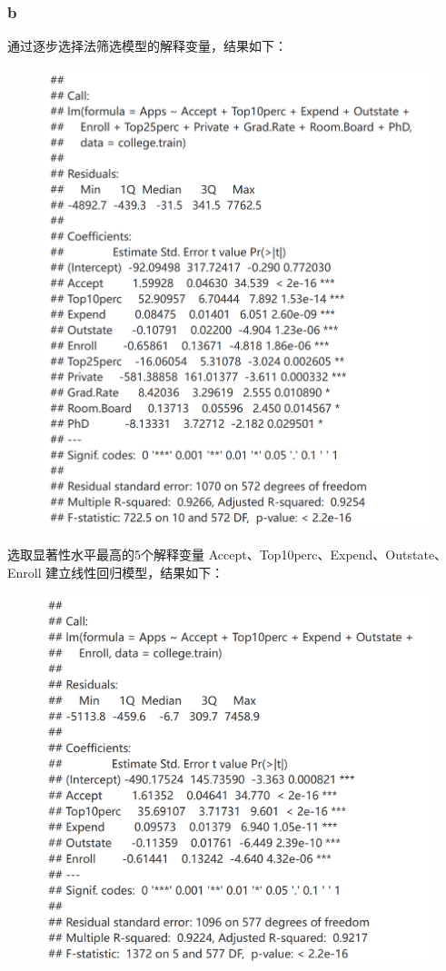 \documentclass[12pt,a4paper]{article}
\begin{document}
    \subsubsection*{b}
    通过逐步选择法筛选模型的解释变量，结果如下：
    \begin{figure}[H]
        \centering
        \includegraphics[scale=0.25]{Stepwise.png}
    \end{figure}
    选取显著性水平最高的5个解释变量 Accept、Top10perc、Expend、Outstate、 Enroll 建立线性回归模型，结果如下：
    \begin{figure}[H]
        \centering
        \includegraphics[scale=0.25]{Linear.png}
    \end{figure}
\end{document}
